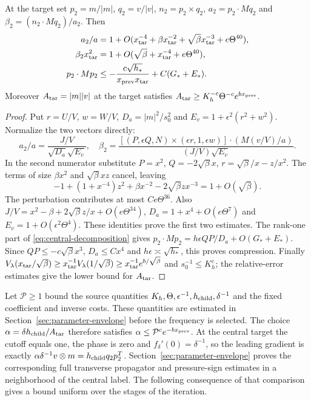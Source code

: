 \begin{lemma}\label{lem:central-renewal}
At the target set $p_2=m/|m|$, $q_2=v/|v|$, $n_2=p_2\times q_2$,
$a_2=p_2\cdot Mq_2$ and $\beta_2=(n_2\cdot Mq_2)/a_2$. Then
\begin{align*}
 a_2/a&=1+O(x_{\rm tar}^{-4}+\beta x_{\rm tar}^{-2}
       +\sqrt\beta x_{\rm tar}^{-3}+e\Theta^{40}),\\
 \beta_2x_{\rm tar}^2&=1+O(\sqrt\beta+x_{\rm tar}^{-4}+e\Theta^{40}),\\
 p_2\cdot Mp_2&\leq-\frac{c\sqrt{h_*}}{x_{\rm prev}x_{\rm tar}}
                                     +C(G_*+E_*).
\end{align*}
Moreover $A_{\rm tar}=|m||v|$ at the target satisfies
$A_{\rm tar}\geq K_h^{-c}\Theta^{-c}e^{b x_{\rm prev}}$.
\end{lemma}
\begin{proof}
Put $r=U/V$, $w=W/V$, $D_a=|m|^2/s_0^2$ and
$E_v=1+\epsilon^2(r^2+w^2)$. Normalize the two vectors directly:
\[
 a_2/a=\frac{J/V}{\sqrt{D_a}\sqrt{E_v}},\quad
 \beta_2=\frac{[(P,\epsilon Q,N)\times(\epsilon r,1,\epsilon w)]
                    \cdot(M(v/V)/a)}{(J/V)\sqrt{E_v}}.
\]
In the second numerator substitute
$P=x^2$, $Q=-2\sqrt\beta x$, $r=\sqrt\beta/x-z/x^2$.
The terms of size $\beta x^2$ and $\sqrt\beta xz$ cancel, leaving
\[
 -1+(1+x^{-4})z^2+\beta x^{-2}-2\sqrt\beta z x^{-3}
       =1+O(\sqrt\beta).
\]
The perturbation contributes at most $Ce\Theta^{36}$.
Also $J/V=x^2-\beta+2\sqrt\beta z/x+O(e\Theta^{34})$,
$D_a=1+x^4+O(e\Theta^7)$ and $E_v=1+O(\epsilon^2\Theta^4)$.
These identities prove the first two estimates. The rank-one part of
\eqref{eq:central-decomposition} gives
$p_2\cdot Mp_2=h\epsilon QP/D_a+O(G_*+E_*)$.
Since $QP\leq-c\sqrt\beta x^3$, $D_a\leq Cx^4$ and
$h\epsilon\asymp\sqrt{h_*}$, this proves compression.
Finally $V_\lambda(x_{\rm tar}/\sqrt\beta)\geq x_{\rm tar}^{-1}
V_\lambda(1/\sqrt\beta)\geq x_{\rm tar}^{-1}e^{b/\sqrt\beta}$ and
$s_0^{-1}\leq K_h^c$; the relative-error estimates give the lower bound
for $A_{\rm tar}$.
\end{proof}

Let $\mathcal P\geq1$ bound the source quantities
$K_h,\Theta,\epsilon^{-1},h_{\rm child},\delta^{-1}$ and the fixed
coefficient and inverse costs. These quantities are estimated in
Section~\ref{sec:parameter-envelope} before the frequency is selected.
The choice $\alpha=\delta h_{\rm child}/A_{\rm tar}$ therefore satisfies
$\alpha\leq\mathcal P^c e^{-b x_{\rm prev}}$.
At the central target the cutoff equals one, the phase is zero and
$f_\delta'(0)=\delta^{-1}$, so the leading gradient is exactly
$\alpha\delta^{-1}v\otimes m=h_{\rm child}q_2p_2^T$.
Section~\ref{sec:parameter-envelope} proves the corresponding full
transverse propagator and pressure-sign estimates in a neighborhood of
the central label. The following consequence of that comparison gives
a bound uniform over the stages of the iteration.

